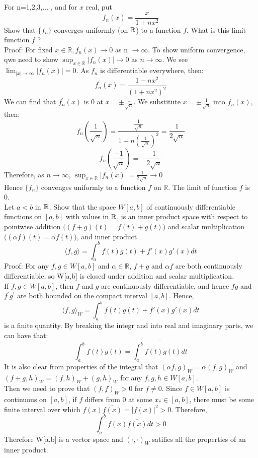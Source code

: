 \documentclass [12pt,letterpaper]{exam}
\begin{document}
\begin{questions}

\question For n=1,2,3,... , and for $x$ real, put 
$$
f_n(x)=\frac{x}{1+nx^2}
$$ 
Show that $\{ f_n \}$ converges uniformly (on $\mathbb{R}$) to a function $f$. What is this limit function $f$ ?\\

Proof: For fixed $x \in \mathbb{R}, f_n(x) \rightarrow 0$ as n $\rightarrow \infty$. To show uniform convergence, qwe need to show $\sup_{x \in \mathbb{R}} |f_n(x)| \rightarrow 0$ as $n \rightarrow \infty$. We see $\lim_{|x| \rightarrow \infty} |f_n(x)| = 0$. As $f_n$ is differentiable everywhere, then:\\
$$f_{n}^{'}(x) = \frac{1-nx^2}{(1+nx^2)^2}$$
We can find that $f_{n}^{'}(x)$ is 0 at $x = \pm \frac{1}{\sqrt{n}}$. We substitute $x = \pm \frac{1}{\sqrt{n}}$ into $f_n(x)$, then:
$$f_n(\frac{1}{\sqrt{n}}) = \frac{\frac{1}{\sqrt{n}}}{1 + n(\frac{1}{\sqrt{n}})^2} = \frac{1}{2\sqrt{n}}$$
$$f_n(\frac{-1}{\sqrt{n}}) = -\frac{1}{2\sqrt{n}}$$
Therefore, as $n \rightarrow \infty$, $\sup_{x \in \mathbb{R}} |f_n(x)| = \frac{1}{2\sqrt{n}} \rightarrow 0$\\
Hence $\big\{ f_n \big\}$ convenges uniformly to a function $f$ on $\mathbb{R}$. The limit of function $f$ is 0.\\

\question %
Let $a<b$ in $\mathbb{R}$. Show that the space $W[a,b]$ of continuously differentiable functions on $[a,b]$
with values in $\mathbb{R}$, is an inner product space with respect to pointwise addition $\bigl( (f+g)(t)=f(t)+g(t)\bigr)$ and
scalar multiplication $\bigl( (\alpha f)(t)=\alpha f(t)\bigr)$, and inner product
$$
\langle f,g\rangle = \int_{a}^{b} f(t)g(t)+f'(x)g'(x) dt
$$
Proof: For any $f,g \in W[a,b]$ and $\alpha \in \mathbb{R}$, $f+g$ and $\alpha f$ are both continuously differentiable, so W[a,b] is closed under addition and scalar multiplication. \\
If $f,g \in W[a,b]$, then $f$ and $g$ are continuously differentiable, and hence $f{g}$ and $f^{'}{g^{'}}$ are both bounded on the compact interval $[a,b]$. Hence,
$${\langle f,g\rangle}_W = \int_{a}^{b} f(t)g(t)+f'(x)g'(x) dt$$ is a finite quantity.
By breaking the integr and into real and imaginary parts, we can have that:
$$\int_{a}^{b} f(t)\overline{g(t)} = \overline{\int_{a}^{b} \overline{f(t)}g(t)dt}$$
It is also clear from properties of the integral that $(\alpha f,g)_W = \alpha (f,g)_W$ and $(f + g,h)_W = (f,h)_W + (g,h)_W$ for any $f,g,h \in W[a,b]$.\\
Then we need to prove that $(f,f)_W > 0$ for $f \neq 0$. Since $f \in W[a,b]$ is continuous on $[a,b]$, if $f$ differs from 0 at some $x_{*} \in [a,b]$, there must be some finite interval over which $f(x)\overline{f(x)} = |f(x)|^2 > 0$. Therefore,
$$\int_{a}^{b} f(x)\overline{f(x)} dt > 0$$
Therefore W[a,b] is a vector space and $(\cdot,\cdot)_W$ satifies all the properties of an inner product.\\


\end{questions}
\end{document}
